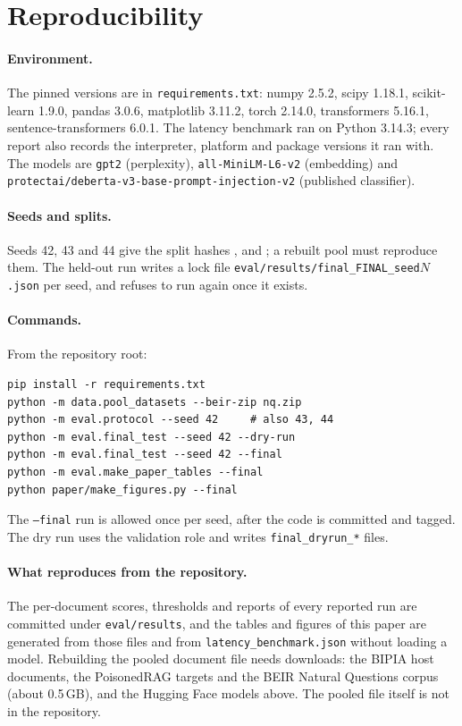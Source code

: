 \appendices
\section{Reproducibility}
\label{app:repro}

\paragraph{Environment.}
The pinned versions are in \texttt{requirements.txt}: numpy 2.5.2, scipy 1.18.1,
scikit-learn 1.9.0, pandas 3.0.6, matplotlib 3.11.2, torch 2.14.0, transformers
5.16.1, sentence-transformers 6.0.1. The latency benchmark ran on Python 3.14.3;
every report also records the interpreter, platform and package versions it ran
with. The models are \texttt{gpt2} (perplexity),
\texttt{all-MiniLM-L6-v2} (embedding) and
\texttt{protectai/\allowbreak deberta-v3-base-\allowbreak prompt-injection-v2} (published classifier).

\paragraph{Seeds and splits.}
Seeds 42, 43 and 44 give the split hashes \texttt{\resHashA},
\texttt{\resHashB} and \texttt{\resHashC}; a rebuilt pool must reproduce them.
The held-out run writes a lock file \texttt{eval/results/final\_FINAL\_seed}$N$\texttt{.json}
per seed, and refuses to run again once it exists.

\paragraph{Commands.}
From the repository root:
{\footnotesize
\begin{verbatim}
pip install -r requirements.txt
python -m data.pool_datasets --beir-zip nq.zip
python -m eval.protocol --seed 42     # also 43, 44
python -m eval.final_test --seed 42 --dry-run
python -m eval.final_test --seed 42 --final
python -m eval.make_paper_tables --final
python paper/make_figures.py --final
\end{verbatim}}
The \texttt{--final} run is allowed once per seed, after the code is committed
and tagged. The dry run uses the validation role and writes
\texttt{final\_dryrun\_*} files.

\paragraph{What reproduces from the repository.}
The per-document scores, thresholds and reports of every reported run are
committed under \texttt{eval/results}, and the tables and figures of this paper are
generated from those files and from \texttt{latency\_benchmark.json} without
loading a model. Rebuilding the pooled document file needs downloads: the BIPIA
host documents, the PoisonedRAG targets and the BEIR Natural Questions corpus
(about 0.5\,GB), and the Hugging Face models above. The pooled file itself is not
in the repository.


